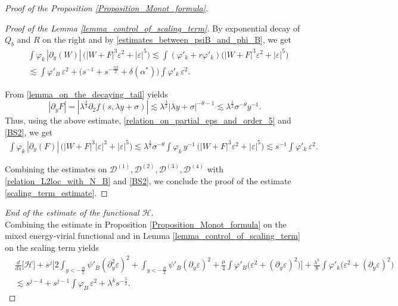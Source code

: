 \documentclass[16pt,english, oneside,reqno]{smfart}
\newcommand{\vare}{{\varepsilon}}
\newcommand{\vphi}{{\varphi}}
\begin{document}
\begin{proof}[Proof of the Proposition \ref{Proposition_Monot_formula}]
\begin{proof}[Proof of the Lemma \ref{lemma_control_of_scaling_term}]
By exponential decay of $Q_b$ and $R$ on the right and by \eqref{estimates_between_psiB_and_phi_B}, we get
\begin{equation}
    \begin{split}
        & \int \vphi_k\,|\partial_y(W)|\,\big( |W+F|^3\vare^2 + |\vare|^5 \big) \lesssim \int (\vphi'_k + r \vphi'_k)\big( |W+F|^3 \vare^2 + |\vare|^5 \big)\\
        & \lesssim \int \vphi'_B\, \vare^2 + \big( s^{-1} + s^{-\frac{3\beta}{2}} +\delta(\alpha^*)\big)\int\vphi'_k \,\vare^2.
    \end{split}
\end{equation}


From \eqref{lemma_on_the_decaying_tail} yields 
\begin{equation}
    |\partial_y F| = |\lambda^{\frac{3}{2}} \partial_2 f(s, \lambda y +\sigma)|  \lesssim \lambda^{\frac{3}{2}}|\lambda y + \sigma|^{-\theta - 1} \lesssim \lambda^{\frac{1}{2}}\sigma^{-\theta}y^{-1}.
\end{equation}
Thus, using the above estimate, \eqref{relation_on_partial_eps_and_order_5} and \eqref{BS2}, we get
\begin{equation}
\begin{split}
    \int\vphi_k\, |\partial_y(F)|\, \big( |W+F|^3 |\vare|^3 + |\vare|^5\big) \lesssim \lambda^{\frac{1}{2}} \sigma^{-\theta} \int \vphi_k\, y^{-1}\, \big( |W+F|^3 \vare^2 + |\vare|^5\big) \lesssim s^{-1}\int \vphi'_k \, \vare^2.
\end{split}
\end{equation}

Combining the estimates on $\mathcal{D}^{(1)},\mathcal{D}^{(2)},\mathcal{D}^{(3)},\mathcal{D}^{(4)}$ with \eqref{relation_L2loc_with_N_B} and \eqref{BS2}, we conclude the proof of the estimate \eqref{scaling_term_estimate}.
\end{proof}

\textit{End of the estimate of the functional $\mathcal{H}$.}\\
Combining the estimate in Proposition \ref{Proposition_Monot_formula} on the mixed energy-virial functional and in Lemma \ref{lemma_control_of_scaling_term} on the scaling term yields
    \begin{equation}\label{control_of_H_in_proof_1}
        \begin{split}
            & \frac{d}{ds}\big[\mathcal{H}\big]+s^j \Big[ 2\int_{y<-\frac B2 } \psi'_B (\partial^2_y \vare)^2 + \int_{y<-\frac B2}\psi'_B (\partial_y \vare)^2 + \frac{\mu}{4} \int \vphi'_B \big( \vare^2 + (\partial_y \vare)^2\big) \Big] + \frac{\lambda^k}{8}\int \vphi'_k \big( \vare^2 + (\partial_y \vare)^2\big)\\  
            & \lesssim s^{j-4} + s^{j-1}\int \vphi_B\,\vare^2+ \lambda^ks^{-\frac 52} .
        \end{split}
    \end{equation}


\end{proof}
\end{document}
